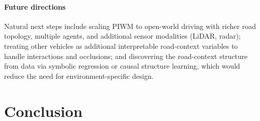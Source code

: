 \documentclass[preprint,12pt]{elsarticle}
\begin{document}
\paragraph{Future directions}
Natural next steps include scaling PIWM to open-world driving with richer road
topology, multiple agents, and additional sensor modalities (LiDAR, radar);
treating other vehicles as additional interpretable road-context variables to
handle interactions and occlusions; and discovering the road-context structure
from data via symbolic regression or causal structure learning, which would
reduce the need for environment-specific design.


\section{Conclusion}\label{sec:conclusion}
\end{document}
